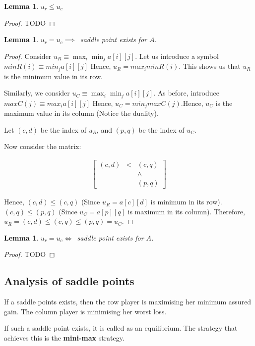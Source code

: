 \documentclass[11pt]{book}
\newtheorem{lemma}[corollary]{Lemma}
\newtheorem{proof}[corollary]{Proof}
\begin{document}
\begin{lemma}
    $u_r \leq u_c$
\end{lemma}
\begin{proof} TODO \end{proof}

\begin{lemma}
    $u_r = u_c \implies $~saddle point exists for $A$.
\end{lemma}
\begin{proof} 
Consider $u_R \equiv \max_i \min_j a[i][j]$. Let us introduce a symbol
$minR(i) \equiv min_j a[i][j]$ Hence, $u_R = max_i minR(i)$. This shows us
that $u_R$ is the minimum value in its row.

Similarly, we consider $u_C \equiv \max_i \min_j a[i][j]$. As before, introduce
$maxC(j) \equiv max_i a[i][j]$ Hence, $u_C = min_j maxC(j)$.Hence, $u_C$ is 
the maximum value in its column (Notice the duality). 

Let $(c, d)$ be the index of $u_R$, and $(p, q)$ be the index of $u_C$.

Now consider the matrix:

\begin{align*}
    \begin{bmatrix}
    (c, d)   & < & (c, q) \\
     & & \wedge \\
     & & (p, q)
    \end{bmatrix}
\end{align*}

Hence, $(c, d) \leq (c, q)$ (Since $u_R = a[c][d]$ is minimum in its row).
$(c, q) \leq(p, q)$ (Since $u_C = a[p][q]$ is maximum in its column).  
Therefore, $u_R = (c, d) \leq (c, q) \leq (p, q) = u_C$.
\end{proof}

\begin{lemma}
    $u_r = u_c \iff $~saddle point exists for $A$.
\end{lemma}
\begin{proof} TODO \end{proof}

\subsection{Analysis of saddle points}
If a saddle points exists, then the row player is maximising her minimum
assured gain. The column player is minimising her worst loss. 

If such a saddle point exists, it is called as an equilibrium. The strategy 
that achieves this is the \textbf{mini-max} strategy.
\end{document}
